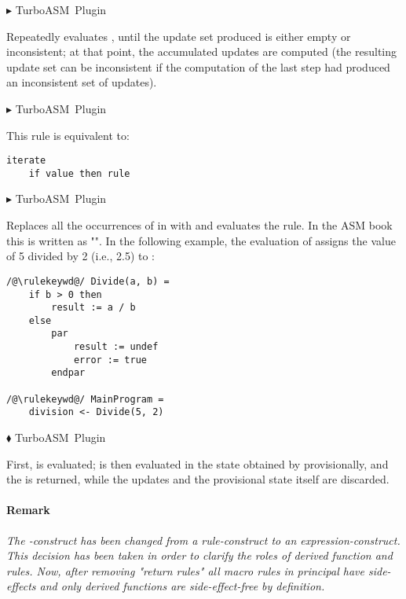 \documentclass{article}
\makeatletter
\newcommand{\ruleform}[2]{\pform{$\blacktriangleright$}{#1}{#2}}
\newcommand{\funcform}[2]{\pform{$\blacklozenge$}{#1}{#2}}
\newcommand{\pform}[3]{\vspace*{4mm} \noindent #1 #2 \vspace{1mm}\textcolor[gray]{0.7}{\dotfill}\mbox{{\sffamily \footnotesize #3}}}
\newcommand{\indexrule}[1]{\index{#1 rule@\asm{#1} rule}}
\makeatother
\begin{document}
\ruleform{
}{TurboASM Plugin}

Repeatedly evaluates , until the update set produced is either empty or inconsistent; at that point, 
the accumulated updates are computed (the resulting update set can be inconsistent if the computation of 
the last step had produced an inconsistent set of updates). 

\ruleform{
}{TurboASM Plugin}
\indexrule{while}

This rule is equivalent to:

\begin{lstlisting}
iterate
	if value then rule
\end{lstlisting}

\ruleform{
}{TurboASM Plugin}

Replaces all the occurrences of  in  with  and
evaluates the rule. In the ASM book this is written as "".
In the following example, the evaluation of
 assigns the value of 5 divided by 2 (i.e., 2.5) to
:

\begin{lstlisting}
/@\rulekeywd@/ Divide(a, b) =
	if b > 0 then
		result := a / b
	else
		par
			result := undef
			error := true
		endpar
		
/@\rulekeywd@/ MainProgram =
	division <- Divide(5, 2)
\end{lstlisting}

\funcform{
}{TurboASM Plugin}

First,  is evaluated;  is then evaluated in the state obtained by provisionally, and the  is returned, while 
the updates and the provisional state itself are discarded.

\paragraph{Remark}
\textit{The -construct has been changed from a \emph{rule}-construct to an \emph{expression}-construct. This decision has been taken in order to clarify the roles of derived function and rules. Now, after removing "return rules" all macro rules in principal have side-effects and only derived functions are side-effect-free by definition.}
\end{document}
